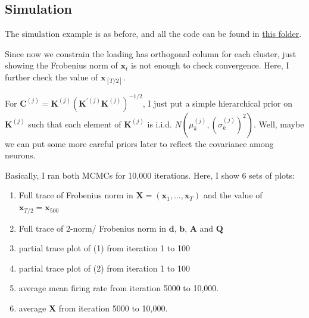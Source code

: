 \documentclass[]{article}
\begin{document}
\subsection{Simulation}
The simulation example is as before, and all the code can be found in \href{https://github.com/weigcdsb/state-space-clustering/tree/main/LDS/blkDiag}{this folder}.

Since now we constrain the loading has orthogonal column for each cluster, just showing the Frobenius norm of $\mathbf{x}_t$ is not enough to check convergence. Here, I further check the value of $\mathbf{x}_{[T/2]}$.

For \(\mathbf{C}^{(j)} = \mathbf{K}^{(j)}\left( \mathbf{K}^{'(j)}\mathbf{K}^{(j)} \right)^{- 1/2}\), I just put a simple hierarchical prior on $\mathbf{K}^{(j)}$ such that each element of $\mathbf{K}^{(j)}$ is i.i.d. $N(\mu_{k}^{(j)}, (\sigma^{(j)}_{k})^2)$. Well, maybe we can put some more careful priors later to reflect the covariance among neurons.

Basically, I ran both MCMCs for 10,000 iterations. Here, I show 6 sets of plots:
\begin{enumerate}
	\def\labelenumi{(\arabic{enumi})}
	\item
	Full trace of Frobenius norm in $\mathbf{X} = (\mathbf{x}_{1},\ldots,\mathbf{x}_{T})$ and the value of $\mathbf{x}_{T/2} = \mathbf{x}_{500}$
	\item
	Full trace of 2-norm/ Frobenius norm in $\mathbf{d}$, $\mathbf{b}$, $\mathbf{A}$ and $\mathbf{Q}$ 
	\item
	partial trace plot of (1) from iteration 1 to 100
	\item
	partial trace plot of (2) from iteration 1 to 100
	\item
	average mean firing rate from iteration 5000 to 10,000.
	\item
	average $\mathbf{X}$ from iteration 5000 to 10,000.
\end{enumerate}
\end{document}
